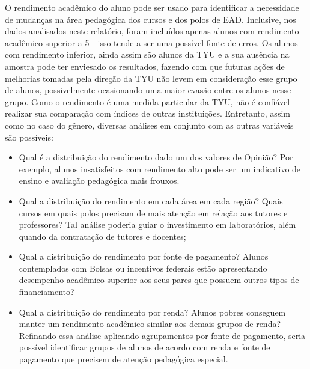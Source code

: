 \documentclass[10pt,a4paper,oneside]{article}
\begin{document}
O rendimento acadêmico do aluno pode ser usado para identificar a necessidade de mudanças na área pedagógica dos cursos e dos polos de EAD. Inclusive, nos dados analisados neste relatório, foram incluídos apenas alunos com rendimento acadêmico superior a 5 - isso tende a ser uma possível fonte de erros. Os alunos com rendimento inferior, ainda assim são alunos da TYU e a sua ausência na amostra pode ter enviesado os resultados, fazendo com que futuras ações de melhorias tomadas pela direção da TYU não levem em consideração esse grupo de alunos, possivelmente ocasionando uma maior evasão entre os alunos nesse grupo. Como o rendimento é uma medida particular da TYU, não é confiável realizar sua comparação com índices de outras instituições. Entretanto, assim como no caso do gênero, diversas análises em conjunto com as outras variáveis são possíveis:
\begin{itemize}
	\item Qual é a distribuição do rendimento dado um dos valores de Opinião? Por exemplo, alunos insatisfeitos com rendimento alto pode ser um indicativo de ensino e avaliação pedagógica mais frouxos.
	\item Qual a distribuição do rendimento em cada área em cada região? Quais cursos em quais polos precisam de mais atenção em relação aos tutores e professores? Tal análise poderia guiar o investimento em laboratórios, além quando da contratação de tutores e docentes;
	\item Qual a distribuição do rendimento por fonte de pagamento? Alunos contemplados com Bolsas ou incentivos federais estão apresentando desempenho acadêmico superior aos seus pares que possuem outros tipos de financiamento? 
	\item Qual a distribuição do rendimento por renda? Alunos pobres conseguem manter um rendimento acadêmico similar aos demais grupos de renda? Refinando essa análise aplicando agrupamentos por fonte de pagamento, seria possível identificar grupos de alunos de acordo com renda e fonte de pagamento que precisem de atenção pedagógica especial.
\end{itemize}
\end{document}
